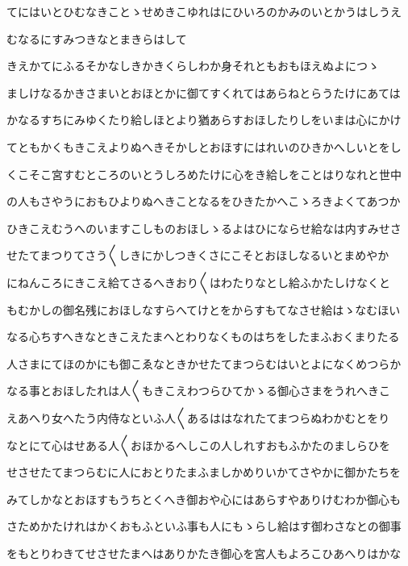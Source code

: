 \documentclass[a4paper,11pt,landscape]{ltjtarticle}
\begin{document}
\par\medskip
てにはいとひむなきことゝせめきこゆれはにひいろのかみのいとかうはしうえ
\par\medskip
むなるにすみつきなとまきらはして
\par\medskip
きえかてにふるそかなしきかきくらしわか身それともおもほえぬよにつゝ
\par\medskip
ましけなるかきさまいとおほとかに御てすくれてはあらねとらうたけにあては
\par\medskip
かなるすちにみゆくたり給しほとより猶あらすおほしたりしをいまは心にかけ
\par\medskip
てともかくもきこえよりぬへきそかしとおほすにはれいのひきかへしいとをし
\par\medskip
くこそこ宮すむところのいとうしろめたけに心をき給しをことはりなれと世中
\par\medskip
の人もさやうにおもひよりぬへきことなるをひきたかへこゝろきよくてあつか
\par\medskip
ひきこえむうへのいますこしものおほしゝるよはひにならせ給なは内すみせさ
\par\medskip
せたてまつりてさう〱しきにかしつきくさにこそとおほしなるいとまめやか
\par\medskip
にねんころにきこえ給てさるへきおり〱はわたりなとし給ふかたしけなくと
\par\medskip
もむかしの御名残におほしなすらへてけとをからすもてなさせ給はゝなむほい
\par\medskip
なる心ちすへきなときこえたまへとわりなくものはちをしたまふおくまりたる
\par\medskip
人さまにてほのかにも御こゑなときかせたてまつらむはいとよになくめつらか
\par\medskip
なる事とおほしたれは人〱もきこえわつらひてかゝる御心さまをうれへきこ
\par\medskip
えあへり女へたう内侍なといふ人〱あるははなれたてまつらぬわかむとをり
\par\medskip
なとにて心はせある人〱おほかるへしこの人しれすおもふかたのましらひを
\par\medskip
せさせたてまつらむに人におとりたまふましかめりいかてさやかに御かたちを
\par\medskip
みてしかなとおほすもうちとくへき御おや心にはあらすやありけむわか御心も
\par\medskip
さためかたけれはかくおもふといふ事も人にもゝらし給はす御わさなとの御事
\par\medskip
をもとりわきてせさせたまへはありかたき御心を宮人もよろこひあへりはかな
\par\medskip
\end{document}
